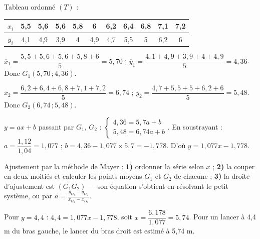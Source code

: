 \documentclass[11pt]{article}
\begin{document}
\begin{questions}
  \item \begin{sousq}
    \item Tableau ordonné $(T)$ :
    \begin{center}\renewcommand{\arraystretch}{1.4}
    \begin{tabular}{|c|c|c|c|c|c|c|c|c|c|c|}
    \hline $x_i$ & 5{,}5 & 5{,}6 & 5{,}6 & 5{,}8 & 6 & 6{,}2 & 6{,}4 & 6{,}8 & 7{,}1 & 7{,}2 \\
    \hline $y_i$ & 4{,}1 & 4{,}9 & 3{,}9 & 4 & 4{,}9 & 4{,}7 & 5{,}5 & 5 & 6{,}2 & 6 \\
    \hline
    \end{tabular}
    \end{center}
    \item $\overline{x}_1 = \dfrac{5{,}5 + 5{,}6 + 5{,}6 + 5{,}8 + 6}{5} = 5{,}70$ ; $\overline{y}_1 = \dfrac{4{,}1 + 4{,}9 + 3{,}9 + 4 + 4{,}9}{5} = 4{,}36$. Donc $G_1(5{,}70\,;4{,}36)$.
    \item $\overline{x}_2 = \dfrac{6{,}2 + 6{,}4 + 6{,}8 + 7{,}1 + 7{,}2}{5} = 6{,}74$ ; $\overline{y}_2 = \dfrac{4{,}7 + 5{,}5 + 5 + 6{,}2 + 6}{5} = 5{,}48$. Donc $G_2(6{,}74\,;5{,}48)$.
  \end{sousq}
  \item \begin{sousq}
    \item $y = ax + b$ passant par $G_1$, $G_2$ : $\begin{cases} 4{,}36 = 5{,}7a + b \\ 5{,}48 = 6{,}74a + b \end{cases}$. En soustrayant : $a = \dfrac{1{,}12}{1{,}04} = 1{,}077$ ; $b = 4{,}36 - 1{,}077\times 5{,}7 = -1{,}778$. D'où $y = 1{,}077x - 1{,}778$.

\begin{methode}
Ajustement par la méthode de Mayer : \textbf{1)} ordonner la série
selon $x$ ; \textbf{2)} la couper en deux moitiés et calculer les
points moyens $G_1$ et $G_2$ de chacune ; \textbf{3)} la droite
d'ajustement est $(G_1 G_2)$ — son équation s'obtient en résolvant le
petit système, ou par $a = \frac{y_{G_2} - y_{G_1}}{x_{G_2} - x_{G_1}}$.
\end{methode}
    \item Pour $y = 4{,}4$ : $4{,}4 = 1{,}077x - 1{,}778$, soit $x = \dfrac{6{,}178}{1{,}077} = 5{,}74$. Pour un lancer à 4,4 m du bras gauche, le lancer du bras droit est estimé à 5,74 m.
  \end{sousq}
\end{questions}
\end{document}
